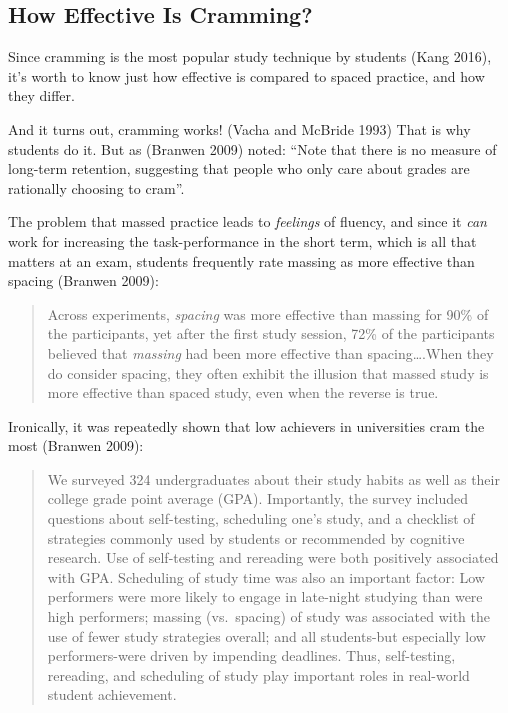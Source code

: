\subsection{How Effective Is Cramming?}\label{how-effective-is-cramming}

Since cramming is the most popular study technique by students (Kang
2016), it's worth to know just how effective is compared to spaced
practice, and how they differ.

And it turns out, cramming works! (Vacha and McBride 1993) That is why
students do it. But as (Branwen 2009) noted: ``Note that there is no
measure of long-term retention, suggesting that people who only care
about grades are rationally choosing to cram''.

The problem that massed practice leads to \emph{feelings} of fluency,
and since it \emph{can} work for increasing the task-performance in the
short term, which is all that matters at an exam, students frequently
rate massing as more effective than spacing (Branwen 2009):

\begin{quote}
Across experiments, \emph{spacing} was more effective than massing for
90\% of the participants, yet after the first study session, 72\% of the
participants believed that \emph{massing} had been more effective than
spacing\ldots{}.When they do consider spacing, they often exhibit the
illusion that massed study is more effective than spaced study, even
when the reverse is true.
\end{quote}

Ironically, it was repeatedly shown that low achievers in universities
cram the most (Branwen 2009):

\begin{quote}
We surveyed 324 undergraduates about their study habits as well as their
college grade point average (GPA). Importantly, the survey included
questions about self-testing, scheduling one's study, and a checklist of
strategies commonly used by students or recommended by cognitive
research. Use of self-testing and rereading were both positively
associated with GPA. Scheduling of study time was also an important
factor: Low performers were more likely to engage in late-night studying
than were high performers; massing (vs.~spacing) of study was associated
with the use of fewer study strategies overall; and all students-but
especially low performers-were driven by impending deadlines. Thus,
self-testing, rereading, and scheduling of study play important roles in
real-world student achievement.
\end{quote}

